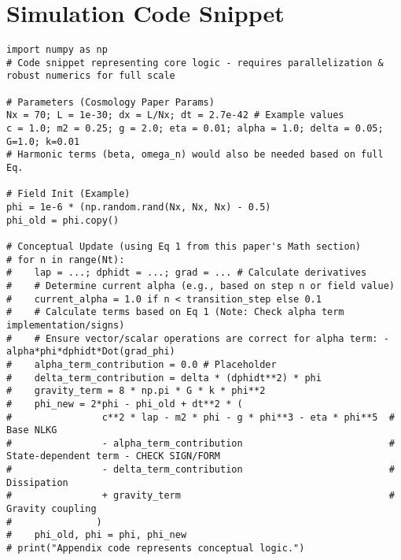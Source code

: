 \documentclass[11pt]{article}
\begin{document}
\section{Simulation Code Snippet}
\begin{lstlisting}
import numpy as np
# Code snippet representing core logic - requires parallelization & robust numerics for full scale

# Parameters (Cosmology Paper Params)
Nx = 70; L = 1e-30; dx = L/Nx; dt = 2.7e-42 # Example values
c = 1.0; m2 = 0.25; g = 2.0; eta = 0.01; alpha = 1.0; delta = 0.05; G=1.0; k=0.01
# Harmonic terms (beta, omega_n) would also be needed based on full Eq.

# Field Init (Example)
phi = 1e-6 * (np.random.rand(Nx, Nx, Nx) - 0.5)
phi_old = phi.copy()

# Conceptual Update (using Eq 1 from this paper's Math section)
# for n in range(Nt):
#    lap = ...; dphidt = ...; grad = ... # Calculate derivatives
#    # Determine current alpha (e.g., based on step n or field value)
#    current_alpha = 1.0 if n < transition_step else 0.1
#    # Calculate terms based on Eq 1 (Note: Check alpha term implementation/signs)
#    # Ensure vector/scalar operations are correct for alpha term: - alpha*phi*dphidt*Dot(grad_phi)
#    alpha_term_contribution = 0.0 # Placeholder
#    delta_term_contribution = delta * (dphidt**2) * phi
#    gravity_term = 8 * np.pi * G * k * phi**2
#    phi_new = 2*phi - phi_old + dt**2 * (
#                c**2 * lap - m2 * phi - g * phi**3 - eta * phi**5  # Base NLKG
#                - alpha_term_contribution                          # State-dependent term - CHECK SIGN/FORM
#                - delta_term_contribution                          # Dissipation
#                + gravity_term                                     # Gravity coupling
#               )
#    phi_old, phi = phi, phi_new
# print("Appendix code represents conceptual logic.")
\end{lstlisting}
\end{document}
